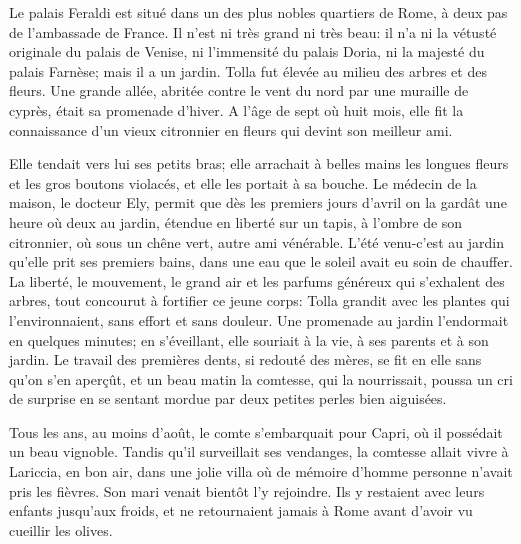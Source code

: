 Le palais Feraldi est situé dans un des plus nobles quartiers de Rome, à deux pas de l’ambassade de France. Il n’est ni très grand ni très beau: il n’a ni la vétusté originale du palais de Venise, ni l’immensité du palais Doria, ni la majesté du palais Farnèse; mais il a un jardin. Tolla fut élevée au milieu des arbres et des fleurs. Une grande allée, abritée contre le vent du nord par une muraille de cyprès, était sa promenade d’hiver. A l’âge de sept où huit mois, elle fit la connaissance d’un vieux citronnier en fleurs qui devint son meilleur ami.

Elle tendait vers lui ses petits bras; elle arrachait à belles mains les longues fleurs et les gros boutons violacés, et elle les portait à sa bouche. Le médecin de la maison, le docteur Ely, permit que dès les premiers jours d’avril on la gardât une heure où deux au jardin, étendue en liberté sur un tapis, à l’ombre de son citronnier, où sous un chêne vert, autre ami vénérable. L’été venu-c’est au jardin qu’elle prit ses premiers bains, dans une eau que le soleil avait eu soin de chauffer. La liberté, le mouvement, le grand air et les parfums généreux qui s’exhalent des arbres, tout concourut à fortifier ce jeune corps: Tolla grandit avec les plantes qui l’environnaient, sans effort et sans douleur. Une promenade au jardin l’endormait en quelques minutes; en s’éveillant, elle souriait à la vie, à ses parents et à son jardin. Le travail des premières dents, si redouté des mères, se fit en elle sans qu’on s’en aperçût, et un beau matin la comtesse, qui la nourrissait, poussa un cri de surprise en se sentant mordue par deux petites perles bien aiguisées.

Tous les ans, au moins d’août, le comte s’embarquait pour Capri, où il possédait un beau vignoble. Tandis qu’il surveillait ses vendanges, la comtesse allait vivre à Lariccia, en bon air, dans une jolie villa où de mémoire d’homme personne n’avait pris les fièvres. Son mari venait bientôt l’y rejoindre. Ils y restaient avec leurs enfants jusqu’aux froids, et ne retournaient jamais à Rome avant d’avoir vu cueillir les olives.


